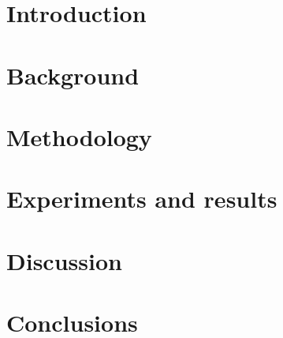 \documentclass{report}
\begin{document}
\afterpage{\blankpage}

\afterpage{\blankpage}

\afterpage{\blankpage}



{
  \hypersetup{linkcolor=black}
  \tableofcontents
}\afterpage{\blankpage}\afterpage{\blankpage}

\chapter{Introduction}
\label{chap:introduction}






\afterpage{\blankpage}


\chapter{Background}
\label{chap:background}






\afterpage{\blankpage}

\chapter{Methodology}
\label{chap:methodology}








\chapter{Experiments and results}
\label{chap:experiments}







\afterpage{\blankpage}

\chapter{Discussion}
\label{chap:discussion}





\chapter{Conclusions}
\label{chap:conclusions}

\afterpage{\blankpage}

 
% 


\appendix
{}
\chapter{}
\label{appendix}

\end{document}
